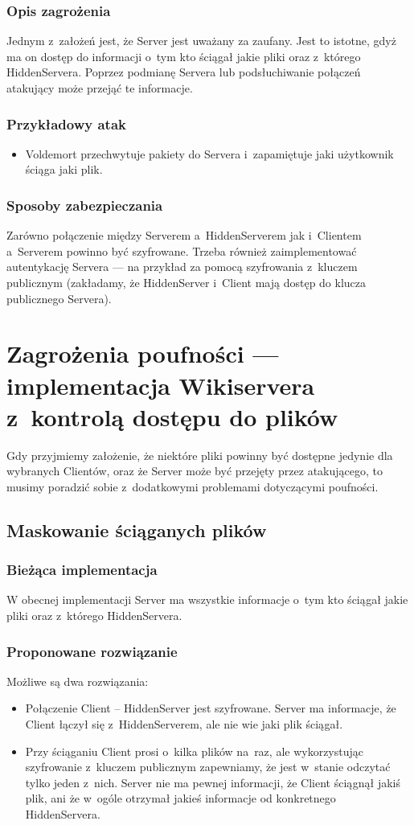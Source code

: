\documentclass[a4paper,notitlepage]{article}
\begin{document}
\subsubsection*{Opis zagrożenia}
Jednym z~założeń jest, że Server jest uważany za zaufany. Jest to istotne,
gdyż ma on dostęp do informacji o~tym kto ściągał
jakie pliki oraz z~którego HiddenServera. Poprzez podmianę Servera lub
podsłuchiwanie połączeń atakujący może przejąć te informacje.
\subsubsection*{Przykładowy atak}
\begin{itemize}
\item Voldemort przechwytuje pakiety do Servera i~zapamiętuje
jaki użytkownik ściąga jaki plik.
\end{itemize}
\subsubsection*{Sposoby zabezpieczania}
Zarówno połączenie między Serverem a~HiddenServerem jak i~Clientem
a~Serverem powinno być szyfrowane. Trzeba również zaimplementować
autentykację Servera --- na przykład za pomocą szyfrowania z~kluczem
publicznym (zakładamy, że HiddenServer i~Client mają dostęp
do klucza publicznego Servera).

\section{Zagrożenia poufności --- implementacja Wikiservera z~kontrolą 
dostępu do plików}
Gdy przyjmiemy założenie, że niektóre pliki powinny być dostępne jedynie
dla wybranych Clientów, oraz że Server może być przejęty przez atakującego,
to musimy poradzić sobie z~dodatkowymi problemami dotyczącymi poufności.

\subsection{Maskowanie ściąganych plików}
\subsubsection*{Bieżąca implementacja}
W obecnej implementacji Server ma wszystkie informacje o~tym kto ściągał
jakie pliki oraz z~którego HiddenServera. 
\subsubsection*{Proponowane rozwiązanie}
Możliwe są dwa rozwiązania:
\begin{itemize}
\item Połączenie Client -- HiddenServer jest szyfrowane. Server ma 
informacje, że Client łączył się z~HiddenServerem, ale nie wie
jaki plik ściągał.
\item Przy ściąganiu Client prosi o~kilka plików na~raz, ale wykorzystując
szyfrowanie z~kluczem publicznym zapewniamy, że jest w~stanie odczytać
tylko jeden z~nich. Server nie ma pewnej informacji, że Client ściągnął
jakiś plik, ani że w~ogóle otrzymał jakieś informacje od konkretnego 
HiddenServera.
\end{itemize}
\end{document}
